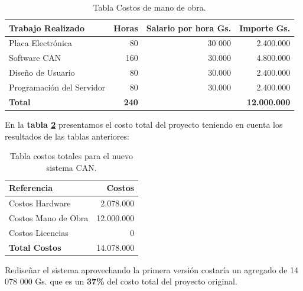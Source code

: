 \begin{table}[H]
\begin{center}
\begin{tabular}{l r r r}
\toprule
\textbf{Trabajo Realizado} & \textbf{Horas}&\textbf{Salario por hora Gs.} & \textbf{Importe Gs.} \\ 
\midrule
 Placa Electrónica & 80 & 30 000  & 2.400.000     \\ 
 Software CAN      & 160  & 30.000  & 4.800.000     \\ 
 Diseño de Usuario & 80  & 30.000  & 2.400.000     \\ 
 Programación del Servidor & 80 & 30.000 & 2.400.000 \\ 
  \textbf{Total } & \textbf{240}  &  & \textbf{12.000.000} \\ \bottomrule
\end{tabular}
\caption{Tabla Costos de mano de obra.}
\label{tabla:extra}
\end{center}
\end{table}



En la \textbf{tabla \ref{tabla:nuevototal}} presentamos el costo total del proyecto teniendo en cuenta los resultados de las tablas anteriores: 

\begin{table}[H]
\begin{center}
\begin{tabular}{l r}
\toprule
\textbf{Referencia} & \textbf{Costos}  \\ 
\midrule
Costos Hardware  & 2.078.000     \\ 
Costos Mano de Obra  & 12.000.000     \\ 
Costos Licencias &         0     \\ 
\textbf{Total Costos} & 14.078.000    \\ 
\bottomrule
\end{tabular}
\caption{Tabla costos totales para el nuevo sistema CAN.}
\label{tabla:nuevototal}
\end{center}
\end{table}

Rediseñar el sistema aprovechando la primera versión costaría un agregado de 14 078 000 Gs. que es un \textbf{37\%} del costo total del proyecto original. 